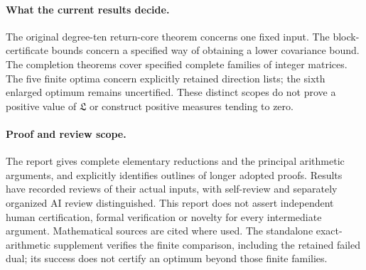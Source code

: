 \paragraph{What the current results decide.}\label{sec:outlook}
The original degree-ten return-core theorem concerns one fixed input.
The block-certificate bounds concern a specified way of obtaining a lower covariance bound.
The completion theorems cover specified complete families of integer matrices.
The five finite optima concern explicitly retained direction lists; the sixth enlarged optimum remains uncertified.
These distinct scopes do not prove a positive value of $\mathfrak L$ or construct positive measures tending to zero.

\paragraph{Proof and review scope.}
The report gives complete elementary reductions and the principal arithmetic arguments, and explicitly identifies outlines of longer adopted proofs.
Results have recorded reviews of their actual inputs, with self-review and separately organized AI review distinguished.
This report does not assert independent human certification, formal verification or novelty for every intermediate argument.
Mathematical sources are cited where used.
The standalone exact-arithmetic supplement verifies the finite comparison, including the retained failed dual; its success does not certify an optimum beyond those finite families.
